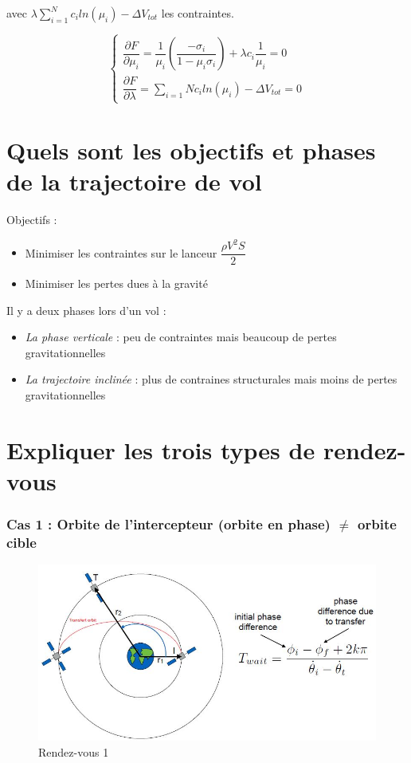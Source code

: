 \documentclass{report}
\begin{document}
avec $\lambda\sum_{i=1}^N c_iln(\mu_i)-\Delta V_{tot}$ les contraintes.

\[
\begin{cases}
\dfrac{\partial F}{\partial\mu_i} = \dfrac{1}{\mu_i}\left(\dfrac{-\sigma_i}{1-\mu_i\sigma_i}\right) + \lambda c_i\dfrac{1}{\mu_i}=0\\
\dfrac{\partial F}{\partial\lambda}=\sum_{i=1}{N}c_i ln(\mu_i)-\Delta V_{tot} = 0
\end{cases}
\]



\section{Quels sont les objectifs et phases de la trajectoire de vol}

Objectifs :
\begin{itemize}
    \item Minimiser les contraintes sur le lanceur $\dfrac{\rho V^2 S}{2}$
    \item Minimiser les pertes dues à la gravité
\end{itemize}

Il y a deux phases lors d'un vol :
\begin{itemize}
    \item \textit{La phase verticale} : peu de contraintes mais beaucoup de pertes gravitationnelles
    \item \textit{La trajectoire inclinée} : plus de contraines structurales mais moins de pertes gravitationnelles
\end{itemize}


\section{Expliquer les trois types de rendez-vous }

\subsubsection{Cas 1 : Orbite de l'intercepteur (orbite en phase) $\ne$ orbite cible }

\begin{figure}[h!]
    \centering
    \includegraphics[scale=0.6]{57.JPG}
    \caption{Rendez-vous 1}
    \label{57}
\end{figure}
\end{document}
